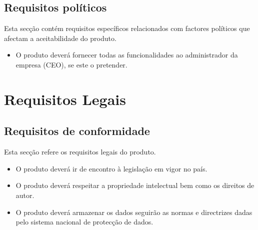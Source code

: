 \subsection{Requisitos políticos}
Esta secção contém requisitos específicos relacionados com factores políticos que afectam a aceitabilidade do produto.
\begin{itemize}
\item O produto deverá fornecer todas as funcionalidades ao administrador da empresa (CEO), se este o pretender.
\end{itemize}

\section{Requisitos Legais}
\subsection{Requisitos de conformidade}
Esta secção refere os requisitos legais do produto.
\begin{itemize}
\item O produto deverá ir de encontro à legislação em vigor no país.
\item O produto deverá respeitar a propriedade intelectual bem como os direitos de autor.
\item O produto deverá armazenar os dados seguirão as normas e directrizes dadas pelo sistema nacional de protecção de dados.
\end{itemize}

